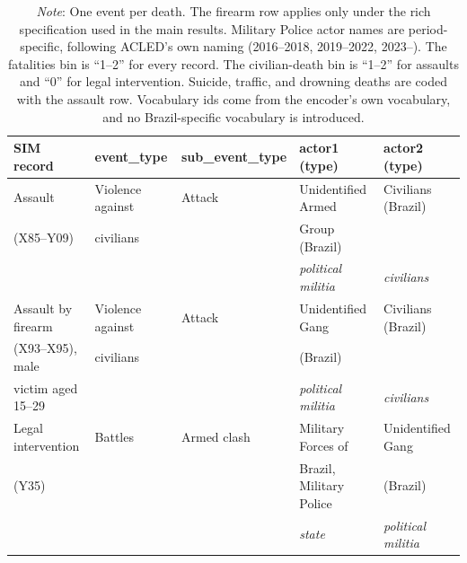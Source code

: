 \documentclass[11pt, letterpaper]{article}
\begin{document}
\begin{table}[!htbp]
\centering
\caption{ICD-10 Cause of Death Mapped to the Pretrained Encoder's Vocabulary}
\label{tab:brazil_vocab}
\small
\begin{tabular}{lllll}
\hline
SIM record & event\_type & sub\_event\_type & actor1 (type) & actor2 (type) \\
\hline
Assault & Violence against & Attack & Unidentified Armed & Civilians (Brazil) \\
(X85--Y09) & civilians & & Group (Brazil) & \\
 & & & \textit{political militia} & \textit{civilians} \\
\hline
Assault by firearm & Violence against & Attack & Unidentified Gang & Civilians (Brazil) \\
(X93--X95), male & civilians & & (Brazil) & \\
victim aged 15--29 & & & \textit{political militia} & \textit{civilians} \\
\hline
Legal intervention & Battles & Armed clash & Military Forces of & Unidentified Gang \\
(Y35) & & & Brazil, Military Police & (Brazil) \\
 & & & \textit{state} & \textit{political militia} \\
\hline
\end{tabular}
\caption*{\footnotesize \textit{Note}: One event per death. The firearm row applies only under the rich specification used in the main results. Military Police actor names are period-specific, following ACLED's own naming (2016--2018, 2019--2022, 2023--). The fatalities bin is ``1--2'' for every record. The civilian-death bin is ``1--2'' for assaults and ``0'' for legal intervention. Suicide, traffic, and drowning deaths are coded with the assault row. Vocabulary ids come from the encoder's own vocabulary, and no Brazil-specific vocabulary is introduced.}
\end{table}
\end{document}
